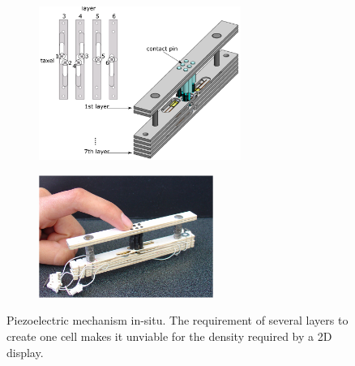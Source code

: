 \begin{figure}[ht]\centering
    \begin{subfigure}[b]{0.45\textwidth}\centering
        \includegraphics[height=5cm]{figures/piezo-full-design-a.png}
        \caption{}
    \end{subfigure}
    \begin{subfigure}[b]{0.45\textwidth}\centering
        \includegraphics[height=4cm]{figures/piezo-full-design-b.png}
        \caption{}
    \end{subfigure}
\caption[Piezoelectric mechanism in-situ]{Piezoelectric mechanism in-situ. The requirement of several layers to create one cell makes it unviable for the density required by a 2D display.}
\label{fig:piezo-full-design}
\end{figure}